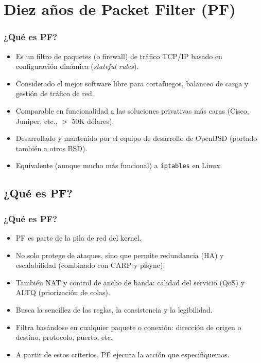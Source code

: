 \documentclass{beamer}
\begin{document}
\section{Diez años de Packet Filter (PF)}

\begin{frame}
\frametitle{¿Qué es PF?}

\begin{itemize}
\item Es un filtro de paquetes (o firewall) de tráfico TCP/IP basado en configuración dinámica (\textit{stateful rules}). 
\item Considerado el mejor software libre para cortafuegos, balanceo de carga y gestión de tráfico de red.
\item Comparable en funcionalidad a las soluciones privativas más caras (Cisco, Juniper, etc., $>$ 50K dólares).
\item Desarrollado y mantenido por el equipo de desarrollo de OpenBSD (portado también a otros BSD). 
\item Equivalente (aunque mucho más funcional) a \texttt{iptables} en Linux.
\end{itemize}

\end{frame}

\subsection{¿Qué es PF?}
\begin{frame}
\frametitle{¿Qué es PF?}

\begin{itemize}
\item PF es parte de la pila de red del kernel.
\item No solo protege de ataques, sino que permite redundancia (HA) y escalabilidad (combinado con CARP y pfsync).
\item También NAT y control de ancho de banda: calidad del servicio (QoS) y ALTQ (priorización de colas).
\item Busca la sencillez de las reglas, la consistencia y la legibilidad.
\item Filtra basándose en cualquier paquete o conexión: dirección de origen o destino, protocolo, puerto, etc.
\item A partir de estos criterios, PF ejecuta la acción que especifiquemos.
\end{itemize}
\end{frame}
\end{document}
